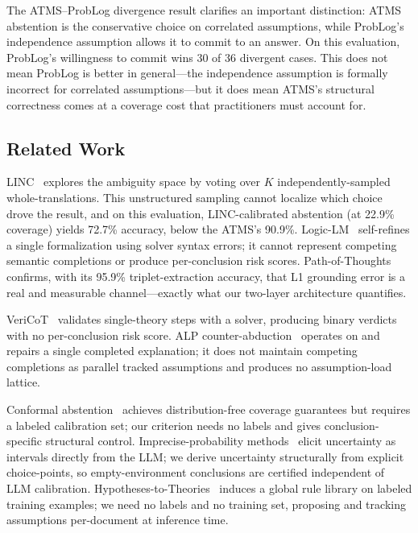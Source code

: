 \documentclass[11pt,letterpaper]{article}
\begin{document}
The ATMS--ProbLog divergence result clarifies an important distinction: ATMS abstention is the
conservative choice on correlated assumptions, while ProbLog's independence assumption allows it to
commit to an answer. On this evaluation, ProbLog's willingness to commit wins 30 of 36 divergent
cases. This does not mean ProbLog is better in general---the independence assumption is formally
incorrect for correlated assumptions---but it does mean ATMS's structural correctness comes at a
coverage cost that practitioners must account for.

\subsection{Related Work}

LINC~\citep{Olausson2023} explores the ambiguity space by voting over $K$ independently-sampled
whole-translations. This unstructured sampling cannot localize which choice drove the result, and on
this evaluation, LINC-calibrated abstention (at 22.9\% coverage) yields 72.7\% accuracy, below the
ATMS's 90.9\%. Logic-LM~\citep{Pan2023} self-refines a single formalization using solver syntax
errors; it cannot represent competing semantic completions or produce per-conclusion risk scores.
Path-of-Thoughts~\citep{Zhang2024} confirms, with its 95.9\% triplet-extraction accuracy, that L1
grounding error is a real and measurable channel---exactly what our two-layer architecture quantifies.

VeriCoT~\citep{Feng2025} validates single-theory steps with a solver, producing binary verdicts with
no per-conclusion risk score. ALP counter-abduction~\citep{Galitsky2026} operates on and repairs a
single completed explanation; it does not maintain competing completions as parallel tracked
assumptions and produces no assumption-load lattice.

Conformal abstention~\citep{AbbasiYadkori2024} achieves distribution-free coverage guarantees but
requires a labeled calibration set; our criterion needs no labels and gives conclusion-specific
structural control. Imprecise-probability methods~\citep{Yang2026} elicit uncertainty as intervals
directly from the LLM; we derive uncertainty structurally from explicit choice-points, so
empty-environment conclusions are certified independent of LLM calibration.
Hypotheses-to-Theories~\citep{Zhu2023} induces a global rule library on labeled training examples; we
need no labels and no training set, proposing and tracking assumptions per-document at inference time.
\end{document}
